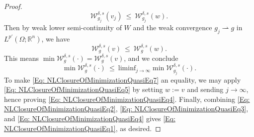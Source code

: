 \documentclass[10pt,a4paper]{amsart}
\def\Om{\Omega}
\def\R{\mathbb{R}}
\def\de{\delta}
\def\liminf{\text{liminf}}
\begin{document}
\begin{proof}
    \begin{equation}\label{Eq: NLClosureOfMinimizationQuasiEq5}
        \mathcal{W}^{\de, s}_{g_j}(v_j) \ \leq \ \mathcal{W}^{\de, s}_{g_j}(w).
    \end{equation}
    Then by weak lower semi-continuity of $W$ and the weak convergence $g_j \rightharpoonup g$ in $L^{p'}(\Om; \R^n)$, we have
    \begin{equation}\label{Eq: NLClosureOfMinimizationQuasiEq6}
        \mathcal{W}^{\de,  s}_g(v) \ \leq \ \mathcal{W}^{\de, s}_g(w).
    \end{equation}    
    This means $\min \mathcal{W}^{\de, s}_g(\cdot) = \mathcal{W}^{\de, s}_g(v)$, and we conclude
    \begin{equation}\label{Eq: NLClosureOfMinimizationQuasiEq7}
       \min \mathcal{W}^{\de, s}_g(\cdot) \ \leq \ \liminf_{j \rightarrow \infty}\min \mathcal{W}^{\de, s}_{g_j}(\cdot).
    \end{equation}
To make \eqref{Eq: NLClosureOfMinimizationQuasiEq7} an equality, we may apply \eqref{Eq: NLClosureOfMinimizationQuasiEq5} by setting $w := v$ and sending $j \rightarrow \infty$, hence proving \eqref{Eq: NLClosureOfMinimizationQuasiEq4}. Finally, combining \eqref{Eq: NLClosureOfMinimizationQuasiEq2}, \eqref{Eq: NLClosureOfMinimizationQuasiEq3}, and \eqref{Eq: NLClosureOfMinimizationQuasiEq4} gives \eqref{Eq: NLClosureOfMinimizationQuasiEq1}, as desired.
    \end{proof}
\end{document}
